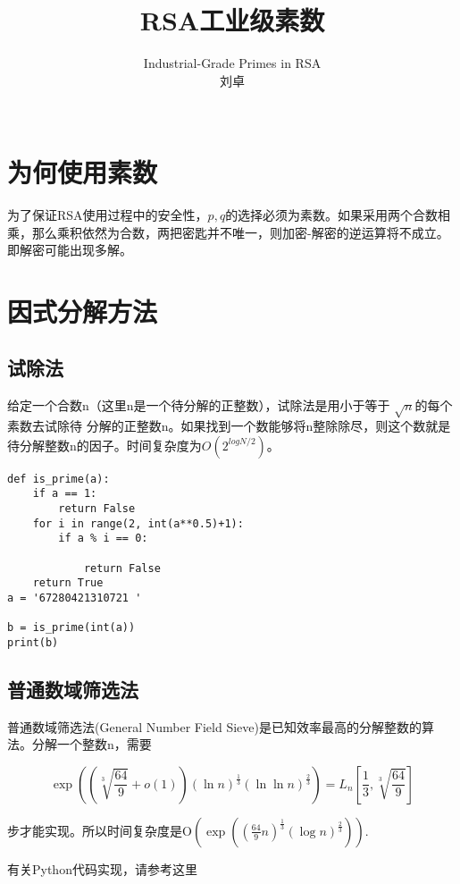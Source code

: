\documentclass{article}
\date{}
\title{RSA工业级素数}
\author{
Industrial-Grade Primes in RSA\\
 刘卓\\
 \texttt{ } \\
}
\begin{document}
\maketitle

\section{为何使用素数}

为了保证RSA使用过程中的安全性，$p,q$的选择必须为素数。如果采用两个合数相乘，那么乘积依然为合数，两把密匙并不唯一，则加密-解密的逆运算将不成立。即解密可能出现多解。

\section{因式分解方法}

\subsection{试除法}
给定一个合数n（这里n是一个待分解的正整数），试除法是用小于等于 $\sqrt{n}$的每个素数去试除待
分解的正整数n。如果找到一个数能够将n整除除尽，则这个数就是待分解整数n的因子。时间复杂度为$O(2^{log{N}/2})$。

\begin{lstlisting}
def is_prime(a):
    if a == 1: 
        return False
    for i in range(2, int(a**0.5)+1):
        if a % i == 0: 
    
            return False
    return True
a = '67280421310721	'

b = is_prime(int(a))
print(b)
\end{lstlisting}

\subsection{普通数域筛选法}

普通数域筛选法(General Number Field Sieve)是已知效率最高的分解整数的算法。分解一个整数n，需要

$$
\exp \left(\left(\sqrt[3]{\frac{64}{9}}+o(1)\right)(\ln n)^{\frac{1}{3}}(\ln \ln n)^{\frac{2}{3}}\right)=L_{n}\left[\frac{1}{3}, \sqrt[3]{\frac{64}{9}}\right]
$$

步才能实现。所以时间复杂度是$\mathrm{O}\left(\exp \left(\left(\frac{64}{9} n\right)^{\frac{1}{3}}(\log n)^{\frac{2}{3}}\right)\right)$.

有关Python代码实现，请参考这里\href{https://pypi.org/project/primefac/}{\color{blue}{primefac}}
\end{document}
